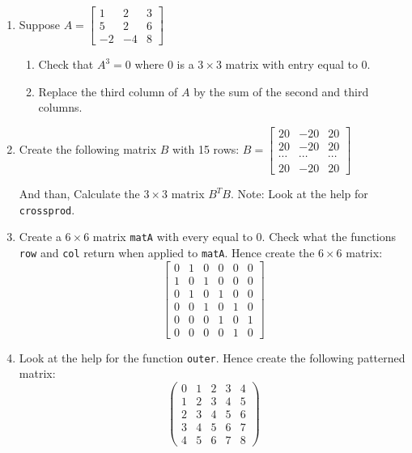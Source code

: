 \documentclass[11pt,a4paper]{article}
\begin{document}
	\begin{enumerate}
		\item Suppose 
		$A = \begin{bmatrix}
			1 & 2 & 3\\ 
			5 & 2 & 6\\ 
			-2 & -4 & 8
		\end{bmatrix}$
		\begin{enumerate}
			\item Check that $A^{3}=0$ where $0$ is a $3\times3$ matrix with entry equal to 0. 
			\item Replace the third column of $A$ by the sum of the second and third columns. 
		\end{enumerate}
	
		\item Create the following matrix $B$ with 15 rows: 
		$B = \begin{bmatrix}
			20 & -20 & 20\\ 
			20 & -20 & 20\\ 
			\cdots & \cdots & \cdots \\
			20 & -20 & 20
		\end{bmatrix}$
	
	And than, Calculate the $3\times3$ matrix $B^{T}B$. Note: Look at the help for \texttt{crossprod}. 
	
		\item Create a $6\times6$ matrix \texttt{matA} with every equal to 0. Check what the functions \texttt{row} and \texttt{col} return when applied to \texttt{matA}. Hence create the $6\times6$ matrix: 
		$$\begin{bmatrix}
			0 & 1 & 0 & 0 & 0 & 0 \\
			1 & 0 & 1 & 0 & 0 & 0 \\
			0 & 1 & 0 & 1 & 0 & 0 \\
			0 & 0 & 1 & 0 & 1 & 0 \\
			0 & 0 & 0 & 1 & 0 & 1 \\
			0 & 0 & 0 & 0 & 1 & 0 
		\end{bmatrix}$$
		
		\item Look at the help for the function \texttt{outer}. Hence create the following patterned matrix:
		$$\begin{pmatrix}
			0 & 1 & 2 & 3 & 4\\ 
			1 & 2 & 3 & 4 & 5\\ 
			2 & 3 & 4 & 5 & 6\\ 
			3 & 4 & 5 & 6 & 7\\ 
			4 & 5 & 6 & 7 & 8
		\end{pmatrix}$$
	

\end{enumerate}
\end{document}
